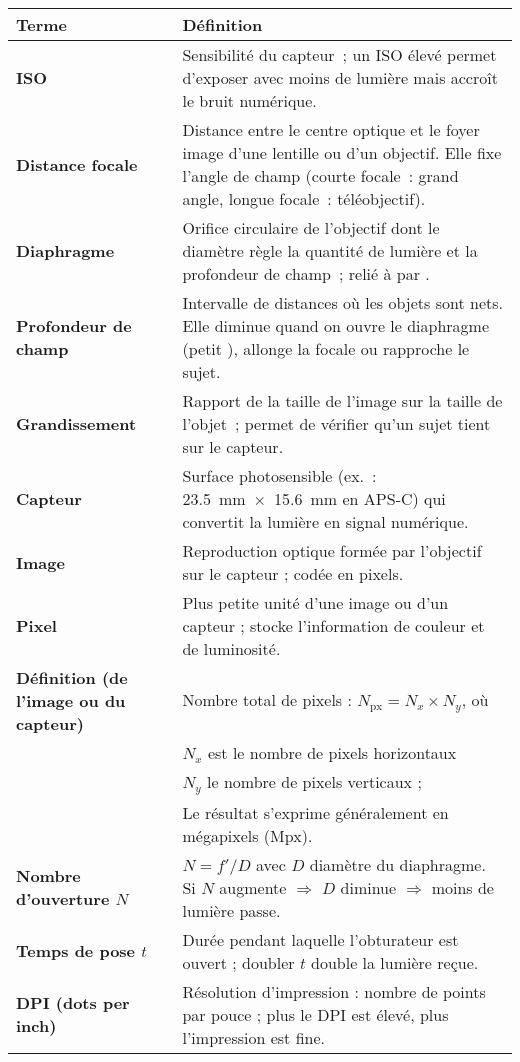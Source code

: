 \documentclass[a4paper,12pt]{article}
\begin{document}
\begin{tabular}{p{} p{}}
\toprule
\textbf{Terme} & \textbf{Définition} \\
\midrule
\textbf{ISO} & Sensibilité du capteur ; un ISO élevé permet d’exposer avec moins de lumière mais accroît le bruit numérique. \\
\midrule
\textbf{Distance focale } & Distance entre le centre optique et le foyer image d’une lentille ou d’un objectif. Elle fixe l’angle de champ (courte focale : grand angle, longue focale : téléobjectif). \\
\midrule
\textbf{Diaphragme} & Orifice circulaire de l’objectif dont le diamètre  règle la quantité de lumière et la profondeur de champ ; relié à  par . \\
\midrule
\textbf{Profondeur de champ} & Intervalle de distances où les objets sont nets. Elle diminue quand on ouvre le diaphragme (petit ), allonge la focale ou rapproche le sujet. \\
\midrule
\textbf{Grandissement } & Rapport de la taille de l’image sur la taille de l’objet ; permet de vérifier qu’un sujet tient sur le capteur. \\
\midrule
\textbf{Capteur} & Surface photosensible (ex. : \SI{23.5}{\milli\metre} × \SI{15.6}{\milli\metre} en APS‑C) qui convertit la lumière en signal numérique. \\
\midrule
\textbf{Image} & Reproduction optique formée par l’objectif sur le capteur ; codée en pixels. \\
\midrule
\textbf{Pixel} & Plus petite unité d’une image ou d’un capteur ; stocke l’information de couleur et de luminosité. \\
\midrule
\textbf{Définition (de l'image ou du capteur)} & Nombre total de pixels : \(N_{\text{px}} = N_x \times N_y\), où \\
& \(N_x\) est le nombre de pixels horizontaux \\
& \(N_y\) le nombre de pixels verticaux ; \\
& Le résultat s’exprime généralement en mégapixels (Mpx). \\
\midrule
\textbf{Nombre d’ouverture \(N\)} & \(N = f'/D\) avec \(D\) diamètre du diaphragme. Si \(N\) augmente \(\Rightarrow\) \(D\) diminue \(\Rightarrow\) moins de lumière passe. \\
\midrule
\textbf{Temps de pose \(t\)} & Durée pendant laquelle l’obturateur est ouvert ; doubler \(t\) double la lumière reçue. \\
\midrule
\textbf{DPI (dots per inch)} & Résolution d’impression : nombre de points par pouce ; plus le DPI est élevé, plus l’impression est fine. \\
\bottomrule
\end{tabular}
\end{document}
